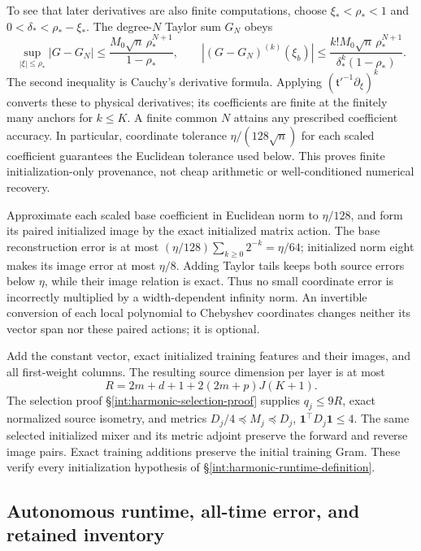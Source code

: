 To see that later derivatives are also finite computations, choose
\(\xi_*<\rho_*<1\) and \(0<\delta_*<\rho_*-\xi_*\).
The degree-\(N\) Taylor sum \(G_N\) obeys
\[
 \sup_{|\xi|\le\rho_*}|G-G_N|
 \le\frac{M_0\sqrt n\,\rho_*^{N+1}}{1-\rho_*},\qquad
 |(G-G_N)^{(k)}(\xi_b)|
 \le\frac{k!M_0\sqrt n\,\rho_*^{N+1}}
             {\delta_*^k(1-\rho_*)}.
\]
The second inequality is Cauchy's derivative formula.  Applying
\((\mathfrak t'^{-1}\partial_\xi)^k\) converts these to physical
derivatives; its coefficients are finite at the finitely many anchors
for \(k\le K\).  A finite common \(N\) attains any prescribed
coefficient accuracy. In particular, coordinate tolerance
\(\eta/(128\sqrt n)\) for each scaled coefficient guarantees the
Euclidean tolerance used below. This proves finite initialization-only
provenance, not cheap arithmetic or well-conditioned numerical recovery.

Approximate each scaled base coefficient in Euclidean norm to
\(\eta/128\), and form its paired initialized image by the exact
initialized matrix action.  The base reconstruction error is at most
\((\eta/128)\sum_{k\ge0}2^{-k}=\eta/64\); initialized norm eight
makes its image error at most \(\eta/8\).  Adding Taylor tails keeps
both source errors below \(\eta\), while their image relation is
exact.  Thus no small coordinate error is incorrectly multiplied by
a width-dependent infinity norm.  An invertible conversion of each
local polynomial to Chebyshev coordinates changes neither its vector
span nor these paired actions; it is optional.

Add the constant vector, exact initialized training features and their
images, and all first-weight columns.  The resulting source dimension
per layer is at most
\begin{equation}
 R=2m+d+1+2(2m+p)J(K+1).
 \label{eq:panel-source-rank}
\end{equation}
The selection proof \S\ref{int:harmonic-selection-proof} supplies
\(q_j\le9R\), exact normalized source isometry, and metrics
\(D_j/4\preceq M_j\preceq D_j\),
\(\mathbf1^\top D_j\mathbf1\le4\).
The same selected initialized mixer and its metric adjoint preserve the
forward and reverse image pairs.  Exact training additions preserve the
initial training Gram.  These verify every initialization hypothesis of
\S\ref{int:harmonic-runtime-definition}.

\subsection{Autonomous runtime, all-time error, and retained inventory}
\label{sec:panel-runtime-proof}

